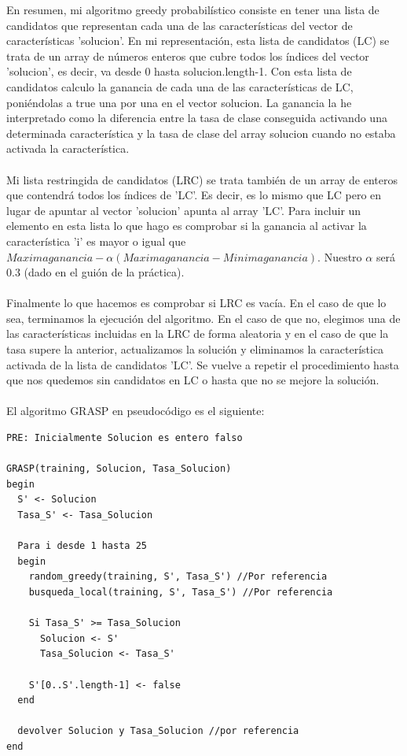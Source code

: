 En resumen, mi algoritmo greedy probabilístico consiste en tener una lista de candidatos que representan cada una de las características del vector de características 'solucion'. En mi representación, esta lista de candidatos (LC) se trata de un array de números enteros que cubre todos los índices del vector 'solucion', es decir, va desde 0 hasta solucion.length-1. Con esta lista de candidatos calculo la ganancia de cada una de las características de LC, poniéndolas a true una por una en el vector solucion. La ganancia la he interpretado como la diferencia entre la tasa de clase conseguida activando una determinada característica y la tasa de clase del array solucion cuando no estaba activada la característica.
\\
\\
Mi lista restringida de candidatos (LRC) se trata también de un array de enteros que contendrá todos los índices de 'LC'. Es decir, es lo mismo que LC pero en lugar de apuntar al vector 'solucion' apunta al array 'LC'. Para incluir un elemento en esta lista lo que hago es comprobar si la ganancia al activar la característica 'i' es mayor o igual que $Maxima ganancia-\alpha(Maxima ganancia - Minima ganancia)$. Nuestro $\alpha$ será 0.3 (dado en el guión de la práctica).
\\
\\
Finalmente lo que hacemos es comprobar si LRC es vacía. En el caso de que lo sea, terminamos la ejecución del algoritmo. En el caso de que no, elegimos una de las características incluidas en la LRC de forma aleatoria y en el caso de que la tasa supere la anterior, actualizamos la solución y eliminamos la característica activada de la lista de candidatos 'LC'. Se vuelve a repetir el procedimiento hasta que nos quedemos sin candidatos en LC o hasta que no se mejore la solución.
\\
\\
El algoritmo GRASP en pseudocódigo es el siguiente:
\begin{lstlisting}
PRE: Inicialmente Solucion es entero falso

GRASP(training, Solucion, Tasa_Solucion)
begin
  S' <- Solucion
  Tasa_S' <- Tasa_Solucion
  
  Para i desde 1 hasta 25
  begin
    random_greedy(training, S', Tasa_S') //Por referencia
    busqueda_local(training, S', Tasa_S') //Por referencia
    
    Si Tasa_S' >= Tasa_Solucion
      Solucion <- S'
      Tasa_Solucion <- Tasa_S'
      
    S'[0..S'.length-1] <- false
  end
  
  devolver Solucion y Tasa_Solucion //por referencia
end
\end{lstlisting}

